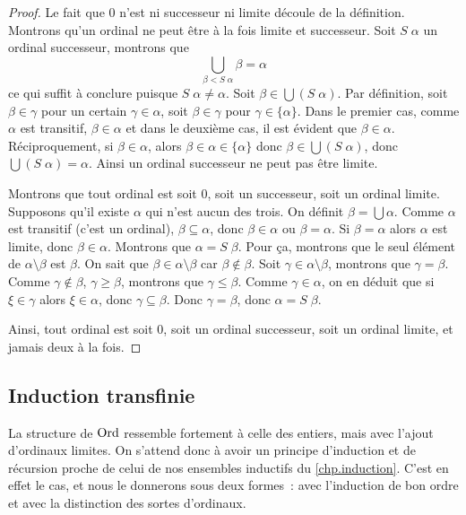 \begin{proof}
  Le fait que $0$ n'est ni successeur ni limite découle de la définition.
  Montrons qu'un ordinal ne peut être à la fois limite et successeur. Soit
  $S\;\alpha$ un ordinal successeur, montrons que
  \[ \bigcup_{\beta < S\;\alpha} \beta = \alpha\]
  ce qui suffit à conclure puisque $S\;\alpha \neq \alpha$.
  Soit $\beta \in \bigcup (S\;\alpha)$. Par définition, soit $\beta \in \gamma$
  pour un certain $\gamma \in \alpha$, soit $\beta \in \gamma$ pour
  $\gamma \in \{\alpha\}$. Dans le premier cas, comme $\alpha$ est transitif,
  $\beta \in \alpha$ et dans le deuxième cas, il est évident que $\beta\in\alpha$.
  Réciproquement, si $\beta \in \alpha$, alors $\beta \in \alpha \in \{\alpha \}$
  donc $\beta \in \bigcup(S\;\alpha)$, donc $\bigcup (S\;\alpha) = \alpha$.
  Ainsi un ordinal successeur ne peut pas être limite.

  Montrons que tout ordinal est soit $0$, soit un successeur, soit un ordinal
  limite. Supposons qu'il existe $\alpha$ qui n'est aucun des trois. On définit
  $\beta = \bigcup \alpha$. Comme $\alpha$ est transitif (c'est un ordinal),
  $\beta \subseteq \alpha$, donc $\beta \in \alpha$ ou $\beta = \alpha$.
  Si $\beta = \alpha$ alors $\alpha$ est limite, donc $\beta \in \alpha$.
  Montrons que $\alpha = S\;\beta$. Pour ça, montrons que le seul élément de
  $\alpha\setminus \beta$ est $\beta$. On sait que
  $\beta \in \alpha \setminus\beta$ car $\beta\notin\beta$. Soit
  $\gamma\in\alpha\setminus\beta$, montrons que $\gamma = \beta$.
  Comme $\gamma\notin\beta$, $\gamma \geq \beta$, montrons que
  $\gamma\leq\beta$. Comme $\gamma \in \alpha$, on en déduit que si
  $\xi\in\gamma$ alors $\xi \in \alpha$, donc $\gamma\subseteq \beta$. Donc
  $\gamma = \beta$, donc $\alpha = S\;\beta$.

  Ainsi, tout ordinal est soit $0$, soit un ordinal successeur, soit un ordinal
  limite, et jamais deux à la fois.
\end{proof}

\subsection{Induction transfinie}

La structure de $\operatorname{Ord}$ ressemble fortement à celle des entiers, mais avec
l'ajout d'ordinaux limites. On s'attend donc à avoir un principe d'induction et
de récursion proche de celui de nos ensembles inductifs du \cref{chp.induction}.
C'est en effet le cas, et nous le donnerons sous deux formes~: avec l'induction
de bon ordre et avec la distinction des sortes d'ordinaux.

